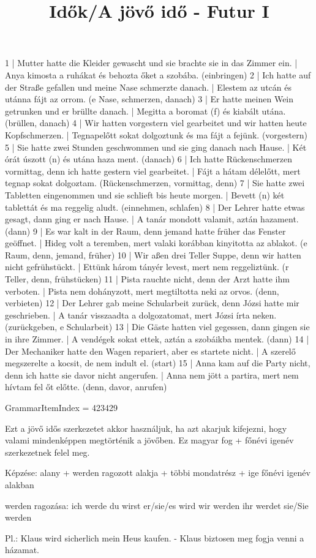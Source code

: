 \begin{exmp}
1 | Mutter hatte die Kleider gewascht und sie brachte sie in das Zimmer ein. | Anya kimosta a ruhákat és behozta őket a szobába. (einbringen)
2 | Ich hatte auf der Straße gefallen und meine Nase schmerzte danach. | Elestem az utcán és utánna fájt az orrom. (e Nase, schmerzen, danach)
3 | Er hatte meinen Wein getrunken und er brüllte danach. | Megitta a boromat (f) és kiabált utána. (brüllen, danach)
4 | Wir hatten vorgestern viel gearbeitet und wir hatten heute Kopfschmerzen. | Tegnapelőtt sokat dolgoztunk és ma fájt a fejünk. (vorgestern)
5 | Sie hatte zwei Stunden geschwommen und sie ging danach nach Hause. | Két órát úszott (n) és utána haza ment. (danach)
6 | Ich hatte Rückenschmerzen vormittag, denn ich hatte gestern viel gearbeitet. | Fájt a hátam délelőtt, mert tegnap sokat dolgoztam. (Rückenschmerzen, vormittag, denn)
7 | Sie hatte zwei Tabletten eingenommen und sie schlieft bis heute morgen. | Bevett (n) két tablettát és ma reggelig aludt. (einnehmen, schlafen)
8 | Der Lehrer hatte etwas gesagt, dann ging er nach Hause. | A tanár mondott valamit, aztán hazament. (dann)
9 | Es war kalt in der Raum, denn jemand hatte früher das Fenster geöffnet. | Hideg volt a teremben, mert valaki korábban kinyitotta az ablakot. (e Raum, denn, jemand, früher)
10 | Wir aßen drei Teller Suppe, denn wir hatten nicht gefrühstückt. | Ettünk három tányér levest, mert nem reggeliztünk. (r Teller, denn, frühstücken)
11 | Pista rauchte nicht, denn der Arzt hatte ihm verboten. | Pista nem dohányzott, mert megtiltotta neki az orvos. (denn, verbieten)
12 | Der Lehrer gab meine Schularbeit zurück, denn Józsi hatte mir geschrieben. | A tanár visszaadta a dolgozatomat, mert Józsi írta neken. (zurückgeben, e Schularbeit)
13 | Die Gäste hatten viel gegessen, dann gingen sie in ihre Zimmer. | A vendégek sokat ettek, aztán a szobáikba mentek. (dann)
14 | Der Mechaniker hatte den Wagen repariert, aber es startete nicht. | A szerelő megszerelte a kocsit, de nem indult el. (start)
15 | Anna kam auf die Party nicht, denn ich hatte sie davor nicht angerufen. | Anna nem jött a partira, mert nem hívtam fel őt előtte. (denn, davor, anrufen)
\end{exmp}

\title{Idők/A jövő idő - Futur I}

GrammarItemIndex = 423429

\begin{desc}
Ezt a jövő idős szerkezetet akkor használjuk, ha azt akarjuk kifejezni, hogy valami mindenképpen megtörténik a jövőben. Ez magyar fog + főnévi igenév szerkezetnek felel meg.

Képzése: alany + werden ragozott alakja + többi mondatrész + ige főnévi igenév alakban

werden ragozása:
ich werde
du wirst
er/sie/es wird
wir werden
ihr werdet
sie/Sie werden

Pl.: Klaus wird sicherlich mein Heus kaufen. - Klaus biztosen meg fogja venni a házamat.
\end{desc}

